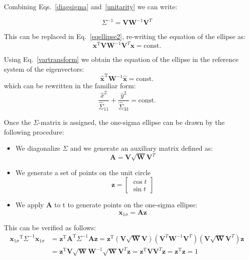 Combining Eqs.~\ref{diagsigma} and~\ref{unitarity} we can write:

\begin{equation}
\Sigma^{-1} = \textbf{V} \textbf{W}^{-1} \textbf{V}^{T}
\end{equation}

This can be replaced in Eq.~\ref{eqellipse2}, re-writing the equation of the ellipse as:
\begin{equation}
\textbf{x}^\mathrm{T}\textbf{V} \textbf{W}^{-1} \textbf{V}^{T}\textbf{x} = \mathrm{const.}
\end{equation}

Using Eq.~\ref{vartransform} we obtain the equation of the ellipse in the reference system of the eigenvectors:
\begin{equation}
\hat{\textbf{x}}^\mathrm{T}\textbf{W}^{-1} \hat{\textbf{x}} = \mathrm{const.}
\end{equation}
which can be rewritten in the familiar form:
\begin{equation}
\frac{\hat{x}^2}{\hat{\Sigma}_{11}}+\frac{\hat{y}^2}{\hat{\Sigma}_{33}}=\mathrm{const.}
\end{equation}

Once the $\Sigma$-matrix is assigned, the one-sigma ellipse can be drawn by the following procedure:
\begin{itemize}
\item We diagonalize $\Sigma$ and we generate an auxiliary matrix defined as:
\begin{equation}
\textbf{A} = \textbf{V} \sqrt{\textbf{W}} \textbf{V}^{T}
\end{equation}
\item We generate a set of points on the unit circle
\begin{equation}
\textbf{z} = \left[
\begin{matrix}
\cos t\\
\sin t
\end{matrix}
\right]
\end{equation}
\item We apply $ \textbf{A} $ to t to generate points on the one-sigma ellipse:
\begin{equation}
\textbf{x}_{1\sigma} = \textbf{A} \textbf{z}
\end{equation}
\end{itemize}

This can be verified as follows:
\begin{align}
{\textbf{x}_{1\sigma}}^\mathrm{T}\Sigma^{-1}\textbf{x}_{1\sigma} 
&= \textbf{z}^\mathrm{T}\textbf{A}^\mathrm{T}\Sigma^{-1}\textbf{A}\textbf{z} = \textbf{z}^\mathrm{T}(\textbf{V} \sqrt{\textbf{W}} \textbf{V})(\textbf{V}^{T} \textbf{W}^{-1} \textbf{V}^{T})(\textbf{V}\sqrt{\textbf{W}} \textbf{V}^{T}) \textbf{z} \nonumber
\\&=\textbf{z}^\mathrm{T}\textbf{V} \sqrt{\textbf{W}}  \textbf{W}^{-1} \sqrt{\textbf{W}} \textbf{V}^{T}\textbf{z}
= \textbf{z}^\mathrm{T}\textbf{V}  \textbf{V}^{T}\textbf{z} 
= \textbf{z}^\mathrm{T}\textbf{z} = 1
\end{align}

